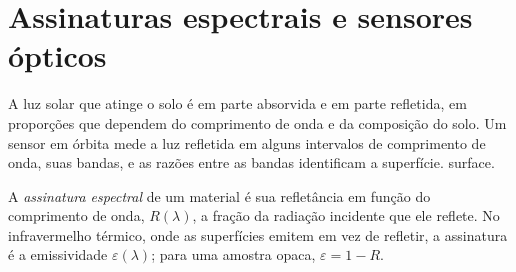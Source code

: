 \section{Assinaturas espectrais e sensores ópticos}\label{sec:b3:remote-sensing-gis:optical}

A luz solar que atinge o solo é em parte absorvida e em parte refletida,
em proporções que dependem do comprimento de onda e da composição do solo.
Um sensor em órbita mede a luz refletida em alguns intervalos de comprimento de onda,
suas bandas, e as razões entre as bandas identificam a superfície.
surface.

\begin{definition}\label{def:b3:remote-sensing-gis:signature}
A \emph{assinatura espectral} de um material é
sua refletância em função do comprimento de onda, $R(\lambda)$, a fração da
radiação incidente que ele reflete. No infravermelho térmico, onde as
superfícies emitem em vez de refletir, a assinatura é a emissividade
$\varepsilon(\lambda)$; para uma amostra opaca, $\varepsilon = 1 - R$.
\end{definition}

